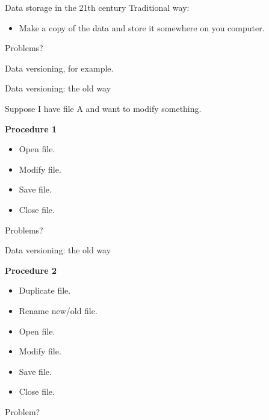 \documentclass{beamer}
\begin{document}
\begin{frame}{Data storage in the 21th century}
  Traditional way:
  
    \begin{itemize}
      \item Make a copy of the data and store it somewhere on you computer.
    \end{itemize}
 
  \pause
  
  Problems?
  
  \tiny{Data versioning, for example.}

\end{frame}

\begin{frame}{Data versioning: the old way}

  Suppose I have file A and want to modify something.
  
  \textbf{Procedure 1}

  \begin{itemize}
  
    \item Open file.
    \item Modify file.
    \item Save file.
    \item Close file.
  
  \end{itemize}

  Problems?
  
\end{frame}
  
\begin{frame}{Data versioning: the old way}

  \textbf{Procedure 2}
  
  \begin{itemize}
  
    \item Duplicate file.
    \item Rename new/old file.
    \item Open file.
    \item Modify file.
    \item Save file.
    \item Close file.
  
  \end{itemize}

  Problem?

\end{frame}
\end{document}
